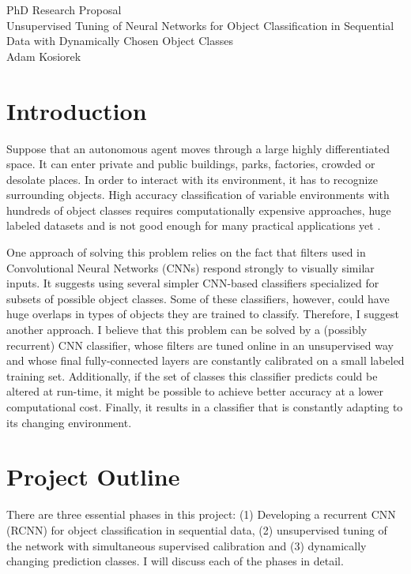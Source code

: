 \documentclass[12pt]{article}
\begin{document}
\begin{center}
{\large PhD Research Proposal}\\[.1in]
{\large Unsupervised Tuning of Neural Networks for Object Classification in Sequential Data with Dynamically Chosen Object Classes}\\[.1in]
{\large Adam Kosiorek}
\end{center}

\section{Introduction}

Suppose that an autonomous agent moves through a large highly differentiated space. It can enter private and public buildings, parks, factories, crowded or desolate places. In order to interact with its environment, it has to recognize surrounding objects. High accuracy classification of variable environments with hundreds of object classes requires computationally expensive approaches, huge labeled datasets and is not good enough for many practical applications yet \cite{imagenet}. 


One approach of solving this problem relies on the fact that filters used in Convolutional Neural Networks (CNNs) respond strongly to visually similar inputs. It suggests using several simpler CNN-based classifiers specialized for subsets of possible object classes. Some of these classifiers, however, could have huge overlaps in types of objects they are trained to classify. Therefore, I suggest another approach. I believe that this problem can be solved by a (possibly recurrent) CNN classifier, whose filters are tuned online in an unsupervised way and whose final fully-connected layers are constantly calibrated on a small labeled training set. Additionally, if the set of classes this classifier predicts could be altered at run-time, it might be possible to achieve better accuracy at a lower computational cost. Finally, it results in a classifier that is constantly adapting to its changing environment.

\section{Project Outline}

There are three essential phases in this project: (1) Developing a recurrent CNN (RCNN) for object classification in sequential data, (2) unsupervised tuning of the network with simultaneous supervised calibration and (3) dynamically changing prediction classes. I will discuss each of the phases in detail.
\end{document}
